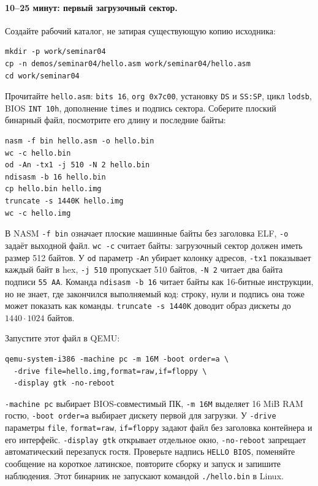 \paragraph{10--25 минут: первый загрузочный сектор.}
Создайте рабочий каталог, не затирая существующую копию исходника:
\begin{lstlisting}[basicstyle=\ttfamily\small]
mkdir -p work/seminar04
cp -n demos/seminar04/hello.asm work/seminar04/hello.asm
cd work/seminar04
\end{lstlisting}
Прочитайте \texttt{hello.asm}: \texttt{bits 16}, \texttt{org 0x7c00},
установку \texttt{DS} и \texttt{SS:SP}, цикл \texttt{lodsb},
BIOS \texttt{INT 10h}, дополнение \texttt{times} и подпись сектора.
Соберите плоский бинарный файл, посмотрите его длину и последние байты:
\begin{lstlisting}[basicstyle=\ttfamily\small]
nasm -f bin hello.asm -o hello.bin
wc -c hello.bin
od -An -tx1 -j 510 -N 2 hello.bin
ndisasm -b 16 hello.bin
cp hello.bin hello.img
truncate -s 1440K hello.img
wc -c hello.img
\end{lstlisting}
В NASM \texttt{-f bin} означает плоские машинные байты без заголовка ELF,
\texttt{-o} задаёт выходной файл. \texttt{wc -c} считает байты:
загрузочный сектор должен иметь размер 512 байтов.
У \texttt{od} параметр \texttt{-An} убирает колонку адресов,
\texttt{-tx1} показывает каждый байт в hex, \texttt{-j 510}
пропускает 510 байтов, \texttt{-N 2} читает два байта подписи
\texttt{55 AA}. Команда \texttt{ndisasm -b 16} читает байты как
16-битные инструкции, но не знает, где закончился выполняемый код:
строку, нули и подпись она тоже может показать как команды.
\texttt{truncate -s 1440K} доводит образ дискеты
до $1440\cdot1024$ байтов.

Запустите этот файл в QEMU:
\begin{lstlisting}[basicstyle=\ttfamily\footnotesize]
qemu-system-i386 -machine pc -m 16M -boot order=a \
  -drive file=hello.img,format=raw,if=floppy \
  -display gtk -no-reboot
\end{lstlisting}
\texttt{-machine pc} выбирает BIOS-совместимый ПК, \texttt{-m 16M}
выделяет 16 MiB RAM гостю, \texttt{-boot order=a} выбирает дискету
первой для загрузки. У \texttt{-drive} параметры \texttt{file},
\texttt{format=raw}, \texttt{if=floppy} задают файл без заголовка
контейнера и его интерфейс. \texttt{-display gtk} открывает отдельное
окно, \texttt{-no-reboot} запрещает автоматический перезапуск гостя.
Проверьте надпись \texttt{HELLO BIOS}, поменяйте сообщение на короткое
латинское, повторите сборку и запуск и запишите наблюдения.
Этот бинарник не запускают командой \texttt{./hello.bin} в Linux.

